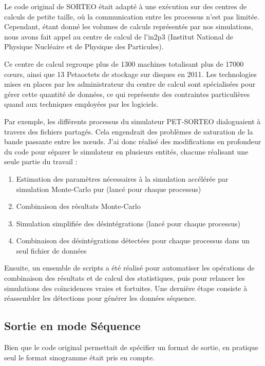 Le code original de SORTEO était adapté à une exécution sur des centres de calculs de petite taille, où la communication entre les processus n’est pas limitée. Cependant, étant donné les volumes de calculs représentés par nos simulations, nous avons fait appel au centre de calcul de l'in2p3 (Institut National de Physique Nucléaire et de Physique des Particules).

Ce centre de calcul regroupe plus de 1300 machines totalisant plus de 17000 cœurs, ainsi que 13 Petaoctets de stockage sur disques en 2011. Les technologies mises en places par les administrateur du centre de calcul sont spécialisées pour gérer cette quantité de données, ce qui représente des contraintes particulières quand aux techniques employées par les logiciels.

Par exemple, les différents processus du simulateur PET-SORTEO dialoguaient à travers des fichiers partagés. Cela engendrait des problèmes de saturation de la bande passante entre les nœuds. J'ai donc réalisé des modifications en profondeur du code pour séparer le simulateur en plusieurs entités, chacune réalisant une seule partie du travail :

    \begin{enumerate}
        \item Estimation des paramètres nécessaires à la simulation accélérée par simulation Monte-Carlo pur (lancé pour chaque processus)
        \item Combinaison des résultats Monte-Carlo
        \item Simulation simplifiée des désintégrations (lancé pour chaque processus)
        \item Combinaison des désintégrations détectées pour chaque processus dans un seul fichier de données
    \end{enumerate}

Ensuite, un ensemble de scripts a été réalisé pour automatiser les opérations de combinaison des résultats et de calcul des statistiques, puis pour relancer les simulations des coïncidences vraies et fortuites. Une dernière étape consiste à réassembler les détections pour générer les données séquence.

\subsection{Sortie en mode Séquence}

Bien que le code original permettait de spécifier un format de sortie, en pratique seul le format sinogramme était pris en compte. 

